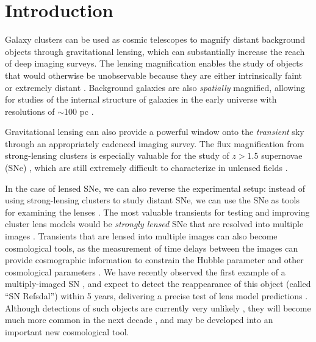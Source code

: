 
\section{Introduction}
\label{sec:Introduction}

Galaxy clusters can be used as cosmic telescopes to magnify distant
background objects through gravitational lensing, which can
substantially increase the reach of deep imaging surveys.  The lensing
magnification enables the study of objects that would otherwise be
unobservable because they are either intrinsically
faint \citep[e.g.][]{Schenker:2012,Alavi:2014} or extremely
distant \citep[e.g.][]{Franx:1997,Ellis:2001,Hu:2002,Kneib:2004,Richard:2006,Richard:2008,Bouwens:2009a,Maizy:2010,Zheng:2012,Coe:2013,Bouwens:2014,Zitrin:2014b}.
Background galaxies are also {\it spatially} magnified, allowing for
studies of the internal structure of galaxies in the early universe
with resolutions of $\sim$100
pc \citep[e.g.][]{Stark:2008,Jones:2010,Yuan:2011,Livermore:2015}.


Gravitational lensing can also provide a powerful window onto the {\it
transient} sky through an appropriately cadenced imaging survey.  The
flux magnification from strong-lensing clusters is especially valuable
for the study of $z>1.5$ supernovae
(SNe) \citep[e.g.]{Kovner:1988,Kolatt:1998,Sullivan:2000,Saini:2000,Gunnarsson:2003,Goobar:2009,Postman:2012},
which are still extremely difficult to characterize in unlensed
fields \citep[e.g.]{Riess:2001,Riess:2007,Suzuki:2012,Rodney:2012,Rubin:2013,Jones:2013}.


In the case of lensed SNe, we can also reverse the experimental setup:
instead of using strong-lensing clusters to study distant SNe, we can
use the SNe as tools for examining the lenses \citep{Riehm:2011}.  The
most valuable transients for testing and improving cluster lens models
would be {\it strongly lensed} SNe that are resolved into multiple
images \citep{Holz:2001,Oguri:2003}.  Transients that are lensed into
multiple images can also become cosmological tools, as the measurement
of time delays between the images can provide cosmographic information
to constrain the Hubble parameter \citep{Refsdal:1964} and other
cosmological parameters \citep{Linder:2011}.  We have recently
observed the first example of a multiply-imaged
SN \citep{Kelly:2015}, and expect to detect the reappearance of this
object (called ``SN Refsdal'') within 5 years, delivering a precise
test of lens model predictions \citep{Oguri:2015,Sharon:2015}.
Although detections of such objects are currently very
unlikely \citep{Li:2012}, they will become much more common in the
next decade \citep{Coe:2009,Dobke:2009}, and may be developed into an
important new cosmological tool.


